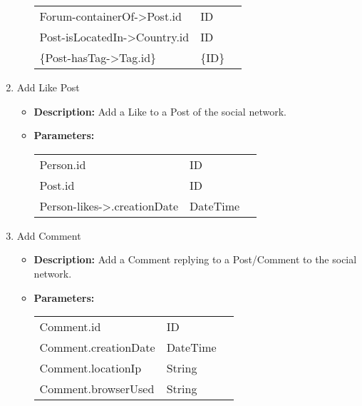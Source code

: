 \begin{enumerate}
\begin{itemize}
\begin{tabular}{lll}
                Forum-containerOf->Post.id & ID & \parbox[t]{20cm}{\par \strut} \\
                Post-isLocatedIn->Country.id & ID & \parbox[t]{20cm}{\par \strut} \\
                     \{Post-hasTag->Tag.id\} & \{ID\} & \parbox[t]{20cm}{\par \strut} \\
            \end{tabular}		
    \end{itemize}
    \item Add Like Post
        \begin{itemize}
            \item \textbf{Description:} Add a Like to a Post of the social network.
        \item \textbf{Parameters:} \\
			\begin{tabular}{lll}
				Person.id 	 			& ID & \parbox[t]{20cm}{\par \strut} \\
                Post.id 	 			& ID & \parbox[t]{20cm}{\par \strut} \\
				Person-likes->.creationDate 	 		& DateTime & \parbox[t]{20cm}{\par \strut} \\
            \end{tabular}		
    \end{itemize}
    \item Add Comment
        \begin{itemize}
        \item \textbf{Description:} Add a Comment replying to a Post/Comment to the social network.
        \item \textbf{Parameters:} \\
			\begin{tabular}{lll}
				Comment.id 	 			& ID & \parbox[t]{20cm}{\par \strut} \\
				Comment.creationDate 			& DateTime & \parbox[t]{20cm}{\par \strut} \\
				Comment.locationIp 	 		& String & \parbox[t]{20cm}{\par \strut} \\
				Comment.browserUsed 	 		& String & \parbox[t]{20cm}{\par \strut} \\

\end{tabular}
\end{itemize}
\end{enumerate}
